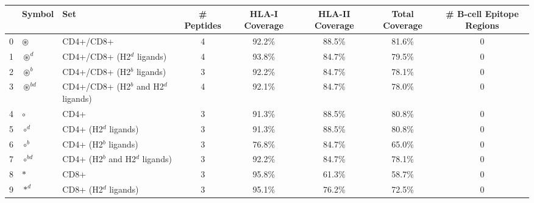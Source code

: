 \begin{tabular}{rllccccc}
\toprule
{} &                                               Symbol &                                      Set &  \# Peptides & HLA-I Coverage & HLA-II Coverage & Total Coverage &  \# B-cell Epitope Regions \\
\midrule
0  &                                      $ \circledast $ &                                CD4+/CD8+ &            4 &         92.2\% &          88.5\% &         81.6\% &                          0 \\
1  &                                    $ \circledast^d $ &               CD4+/CD8+ (H2$^d$ ligands) &            4 &         93.8\% &          84.7\% &         79.5\% &                          0 \\
2  &                                    $ \circledast^b $ &               CD4+/CD8+ (H2$^b$ ligands) &            3 &         92.2\% &          84.7\% &         78.1\% &                          0 \\
3  &                                 $ \circledast^{bd} $ &    CD4+/CD8+ (H2$^b$ and H2$^d$ ligands) &            4 &         92.1\% &          84.7\% &         78.0\% &                          0 \\
4  &                                            $ \circ $ &                                     CD4+ &            3 &         91.3\% &          88.5\% &         80.8\% &                          0 \\
5  &                                          $ \circ^d $ &                    CD4+ (H2$^d$ ligands) &            3 &         91.3\% &          88.5\% &         80.8\% &                          0 \\
6  &                                          $ \circ^b $ &                    CD4+ (H2$^b$ ligands) &            3 &         76.8\% &          84.7\% &         65.0\% &                          0 \\
7  &                                       $ \circ^{bd} $ &         CD4+ (H2$^b$ and H2$^d$ ligands) &            3 &         92.2\% &          84.7\% &         78.1\% &                          0 \\
8  &                                             $ \ast $ &                                     CD8+ &            3 &         95.8\% &          61.3\% &         58.7\% &                          0 \\
9  &                                           $ \ast^d $ &                    CD8+ (H2$^d$ ligands) &            3 &         95.1\% &          76.2\% &         72.5\% &                          0 \\

\end{tabular}
